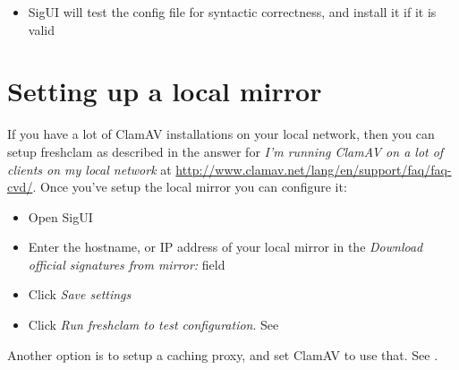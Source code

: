 \begin{itemize}
\begin{itemize}
\item SigUI will test the config file for syntactic correctness, and install it if it is valid
\end{itemize}
\end{itemize}

\section{Setting up a local mirror}
\label{sec:localmirror}

If you have a lot of ClamAV installations on your local network, then you can setup \gls{freshclam} as described in the answer for  \emph{I’m running ClamAV on a lot of clients on my local network} at \url{http://www.clamav.net/lang/en/support/faq/faq-cvd/}.
Once you've setup the local mirror you can configure it:
\begin{itemize}
\item Open SigUI
\item Enter the hostname, or IP address of your local mirror in the \emph{Download official signatures from mirror:} field
\item Click \emph{Save settings}
\item Click \emph{Run freshclam to test configuration}. See 
\end{itemize}

Another option is to setup a caching proxy, and set ClamAV to use that. See .
